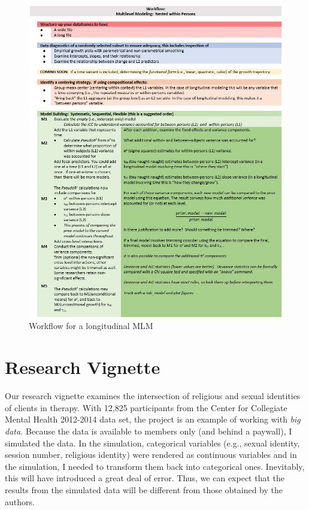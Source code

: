 \documentclass[
  11pt,
]{book}
\begin{document}
\begin{figure}
\centering
\includegraphics{images/LongExpl/WrkFlowLong.jpg}
\caption{Workflow for a longitudinal MLM}
\end{figure}

\hypertarget{research-vignette-1}{%
\section{Research Vignette}\label{research-vignette-1}}

Our research vignette \citep{lefevor_religious_2017} examines the intersection of religious and sexual identities of clients in therapy. With 12,825 participants from the Center for Collegiate Mental Health 2012-2014 data set, the project is an example of working with \emph{big data.} Because the data is available to members only (and behind a paywall), I simulated the data. In the simulation, categorical variables (e.g., sexual identity, session number, religious identity) were rendered as continuous variables and in the simulation, I needed to transform them back into categorical ones. Inevitably, this will have introduced a great deal of error. Thus, we can expect that the results from the simulated data will be different from those obtained by the authors.
\end{document}
